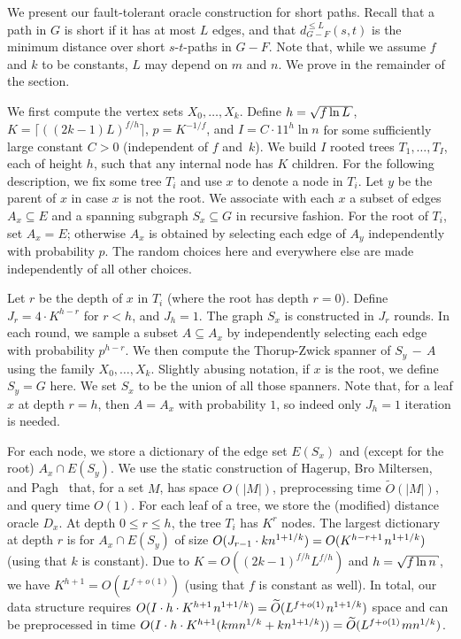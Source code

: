 \documentclass{theoretics}
\newcommand*{\Otilde}{\widetilde{O}}
\newcommand*{\nwspace}{\hspace*{.1em}}
\renewcommand{\le}{\leqslant}
\let\oldsqrt\sqrt
\def\hksqrt{\mathpalette\DHLhksqrt}
\def\DHLhksqrt#1#2{\setbox0=\hbox{$#1\oldsqrt{#2\,}$}\dimen0=\ht0
   \advance\dimen0-0.2\ht0
   \setbox2=\hbox{\vrule height\ht0 depth -\dimen0}%
   {\box0\lower0.4pt\box2}}
\renewcommand\sqrt\hksqrt
\begin{document}
We present our fault-tolerant oracle construction for short paths.
Recall that a path in $G$ is short if it has at most $L$ edges,
and that $d_{G-F}^{\le L}(s,t)$ is the minimum distance over short $s$-$t$-paths in $G-F$.
Note that, while we assume $f$ and $k$ to be constants, $L$ may depend on $m$ and $n$.
We prove  in the remainder of the section.
   
We first compute the vertex sets $X_0, \dots,X_k$.
Define {$h=\sqrt{f\ln L}$}, {$K = \big\lceil((2k{-}1)L)^{{f}/{h}}\big\rceil $, $p = K^{-1/f}$, and $I = C \cdot 11^{h} \ln n$} 
for some sufficiently large constant $C > 0$ (independent of $f$ and~$k$).
We build $I$ rooted trees $T_1, \dots, T_I$, each of height $h$,
such that any internal node has {$K$} children.
For the following description, we fix some tree $T_i$ and use $x$ to denote a node in $T_i$.
Let $y$ be the parent of $x$ in case $x$ is not the root.
We associate with each $x$ a subset of edges $A_x \subseteq E$ 
and a spanning subgraph $S_x \subseteq G$ in recursive fashion.
For the root of $T_i$, set $A_x = E$;
otherwise $A_x$ is obtained by selecting each edge of $A_y$ independently with probability $p$.
The random choices here and everywhere else
are made independently of all other choices.

Let $r$ be the depth of $x$ in $T_i$ (where the root has depth $r = 0$).
Define $J_r = 4 \cdot K^{h-r}$ for $r < h$, and $J_h = 1$.
The graph $S_x$ is constructed in $J_r$ rounds.
In each round, we sample a subset $A \subseteq A_x$ 
by independently selecting each edge with probability $p^{h-r}$.
We then compute the Thorup-Zwick spanner of $S_y\,{-}\,A$
using the family $X_0,\dots,X_k$.
Slightly abusing notation, if $x$ is the root, we define $S_y = G$ here.
We set $S_x$ to be the union of all those spanners.
Note that, for a leaf $x$ at depth $r = h$, then $A = A_x$ with probability $1$,
so indeed only $J_h = 1$ iteration is needed.

For each node, we store a dictionary of the edge set $E(S_x)$ 
and (except for the root) $A_x \cap E(S_y)$.
We use the static construction of Hagerup, Bro Miltersen, and Pagh~\cite{HagerupMiltersenPagh01DeterministicDictionaries}
that, for a set $M$, has space $O(|M|)$, preprocessing time $\Otilde(|M|)$,
and query time $O(1)$.
For each leaf of a tree, we store the (modified) distance oracle $D_x$.
At depth $0 \le r \le h$, 
the tree $T_i$ has $K^r$ nodes.
The largest dictionary at depth $r$ is for $A_x \cap E(S_y)$
of size $O(J_{r-1} \cdot kn^{1+1/k}) = O(K^{h-r+1} \nwspace n^{1+1/k})$
(using that $k$ is constant).
Due to $K = O((2k{-}1)^{f/h} L^{f/h})$ and $h = \sqrt{f \ln n}$,
we have $K^{h+1} = O(L^{f+o(1)})$ (using that $f$ is constant as well).
In total, our data structure requires 
$O(I \cdot h\cdot K^{h+1} \nwspace n^{1+1/k}) = \Otilde(L^{f+o(1)} \nwspace n^{1+1/k})$ space
and can be preprocessed in time 
$O(I \cdot h\cdot K^{h+1} (kmn^{1/k} + kn^{1+1/k})) = \Otilde(L^{f+o(1)} \nwspace mn^{1/k})$.
\end{document}
